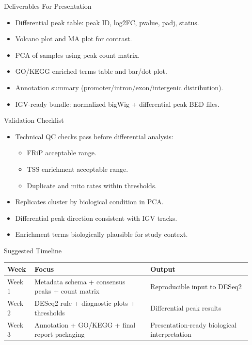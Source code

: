 \documentclass[aspectratio=169]{beamer}
\begin{document}
\begin{frame}{Deliverables For Presentation}
\begin{itemize}
  \item Differential peak table: peak ID, log2FC, pvalue, padj, status.
  \item Volcano plot and MA plot for contrast.
  \item PCA of samples using peak count matrix.
  \item GO/KEGG enriched terms table and bar/dot plot.
  \item Annotation summary (promoter/intron/exon/intergenic distribution).
  \item IGV-ready bundle: normalized bigWig + differential peak BED files.
\end{itemize}
\end{frame}

\begin{frame}{Validation Checklist}
\begin{itemize}
  \item Technical QC checks pass before differential analysis:
  \begin{itemize}
    \item FRiP acceptable range.
    \item TSS enrichment acceptable range.
    \item Duplicate and mito rates within thresholds.
  \end{itemize}
  \item Replicates cluster by biological condition in PCA.
  \item Differential peak direction consistent with IGV tracks.
  \item Enrichment terms biologically plausible for study context.
\end{itemize}
\end{frame}

\begin{frame}{Suggested Timeline}
\small
\begin{tabularx}{\textwidth}{>{\RaggedRight\arraybackslash}p{} >{\RaggedRight\arraybackslash}X >{\RaggedRight\arraybackslash}p{}}
\toprule
\textbf{Week} & \textbf{Focus} & \textbf{Output} \\
\midrule
Week 1 & Metadata schema + consensus peaks + count matrix & Reproducible input to DESeq2 \\
Week 2 & DESeq2 rule + diagnostic plots + thresholds & Differential peak results \\
Week 3 & Annotation + GO/KEGG + final report packaging & Presentation-ready biological interpretation \\
\bottomrule
\end{tabularx}
\end{frame}
\end{document}
